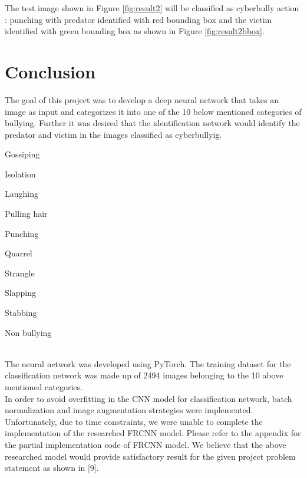 \documentclass[12pt]{article}
\begin{document}
The test image shown in Figure \ref{fig:result2} will be classified as cyberbully action : punching with predator identified with red bounding box and the victim identified with green bounding box as shown in Figure \ref{fig:result2bbox}.


\section{Conclusion}
The goal of this project was to develop a deep neural network that takes an image as input and categorizes it into one of the 10 below mentioned categories of bullying. Further it was desired that the identification network would identify the predator and victim in the images classified as cyberbullyig. \\
\begin {enumerate*} [1) ]%
	\item Gossiping
	\item Isolation
	\item Laughing
	\item Pulling hair
	\item Punching
	\item Quarrel
	\item Strangle
	\item Slapping
	\item Stabbing
	\item Non bullying
\end {enumerate*} \\
The neural network was developed using PyTorch. The training dataset for the classification network was made up of 2494 images belonging to the 10 above mentioned categories. \\

In order to avoid overfitting in the CNN model for classification network, batch normalization and image augmentation strategies were implemented. \\

Unfortunately, due to time constraints, we were unable to complete the implementation of the researched FRCNN model. Please refer to the appendix for the partial implementation code of FRCNN model. We believe that the above researched model would provide satisfactory result for the given project problem statement as shown in [9]. 

\newpage
\end{document}
